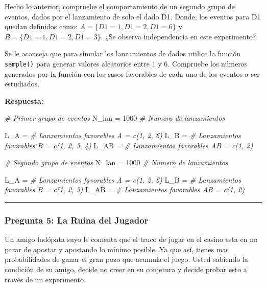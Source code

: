 \documentclass[]{article}
\newenvironment{Shaded}{\begin{snugshade}}{\end{snugshade}}
\newcommand{\CommentTok}[1]{\textcolor[rgb]{0.56,0.35,0.01}{\textit{#1}}}
\newcommand{\DecValTok}[1]{\textcolor[rgb]{0.00,0.00,0.81}{#1}}
\newcommand{\NormalTok}[1]{#1}
\newcommand{\OtherTok}[1]{\textcolor[rgb]{0.56,0.35,0.01}{#1}}
\begin{document}
Hecho lo anterior, compruebe el comportamiento de un segundo grupo de
eventos, dados por el lanzamiento de solo el dado D1. Donde, los eventos
para D1 quedan definidos como: \(A =\{D1=1,D1=2,D1=6\}\) y
\(B=\{D1=1,D1=2,D1=3\}\). ¿Se observa independencia en este
experimento?.

Se le aconseja que para simular los lanzamientos de dados utilice la
función \texttt{sample()} para generar valores aleatorios entre 1 y 6.
Compruebe los números generados por la función con los casos favorables
de cada uno de los eventos a ser estudiados.

\textbf{Respuesta:}

\begin{Shaded}
\begin{Highlighting}[]
\CommentTok{\# Primer grupo de eventos}
\NormalTok{N\_lan }\OtherTok{=} \DecValTok{1000} \CommentTok{\# Numero de lanzamientos}
  
\NormalTok{L\_A }\OtherTok{=}  \CommentTok{\# Lanzamientos favorables A = c(1, 2, 6)}
\NormalTok{L\_B }\OtherTok{=}  \CommentTok{\# Lanzamientos favorables B = c(1, 2, 3, 4)}
\NormalTok{L\_AB }\OtherTok{=} \CommentTok{\# Lanzamientos favorables AB = c(1, 2)}
\end{Highlighting}
\end{Shaded}

\begin{Shaded}
\begin{Highlighting}[]
\CommentTok{\# Segundo grupo de eventos}
\NormalTok{N\_lan }\OtherTok{=} \DecValTok{1000} \CommentTok{\# Numero de lanzamientos}
  
\NormalTok{L\_A }\OtherTok{=}  \CommentTok{\# Lanzamientos favorables A = c(1, 2, 6)}
\NormalTok{L\_B }\OtherTok{=}  \CommentTok{\# Lanzamientos favorables B = c(1, 2, 3)}
\NormalTok{L\_AB }\OtherTok{=} \CommentTok{\# Lanzamientos favorables AB = c(1, 2)}
\end{Highlighting}
\end{Shaded}

\begin{center}\rule{0.5\linewidth}{0.5pt}\end{center}

\hypertarget{pregunta-5-la-ruina-del-jugador}{%
\subsubsection{Pregunta 5: La Ruina del
Jugador}\label{pregunta-5-la-ruina-del-jugador}}

Un amigo ludópata suyo le comenta que el truco de jugar en el casino
esta en no parar de apostar y apostando lo mínimo posible. Ya que así,
tienes mas probabilidades de ganar el gran pozo que acumula el juego.
Usted sabiendo la condición de su amigo, decide no creer en su conjetura
y decide probar esto a través de un experimento.
\end{document}
